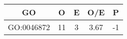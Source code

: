 \begin{tabular}{ccccc}
  \hline
  GO & O & E & O/E & P\\\hline
  GO:0046872 & 11 & 3 & 3.67 & -1\\
  \hline
\end{tabular}
